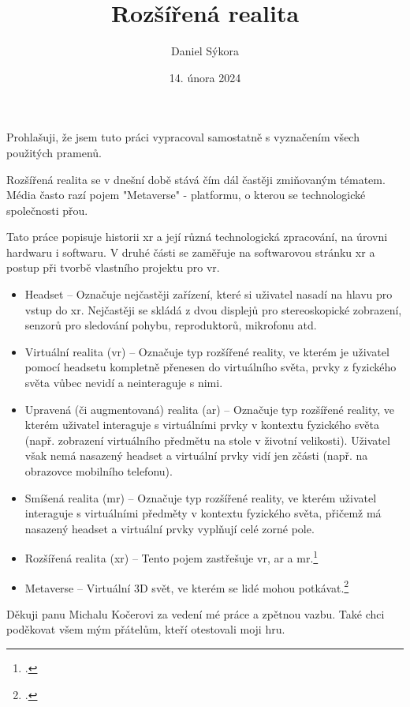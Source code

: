 \documentclass[12pt]{report}
\author{Daniel Sýkora}
\title{Rozšířená realita}
\date{14. února 2024}
\begin{document}
\mytitlepage
\prohlaseni
{
	Prohlašuji, že jsem tuto práci vypracoval samostatně s vyznačením všech použitých pramenů.
}
\abstrakt
{ %
	Rozšířená realita se v dnešní době stává čím dál častěji zmiňovaným tématem. Média často razí pojem "Metaverse" - platformu, o kterou se technologické společnosti přou.

	Tato práce popisuje historii \gls{xr} a její různá technologická zpracování, na úrovni hardwaru i softwaru. V druhé části se zaměřuje na softwarovou stránku \gls{xr} a postup při tvorbě vlastního projektu pro \gls{vr}.
}
{ %
	\begin{itemize}
		\item Headset -- Označuje nejčastěji zařízení, které si uživatel nasadí na hlavu pro vstup do \gls{xr}.
				Nejčastěji se skládá z dvou displejů pro stereoskopické zobrazení, senzorů pro sledování pohybu,
				reproduktorů, mikrofonu atd.

		\item Virtuální realita (\gls{vr}) -- Označuje typ rozšířené reality, ve kterém je uživatel pomocí headsetu
				kompletně přenesen do virtuálního světa, prvky z fyzického světa vůbec nevidí a neinteraguje s nimi.

		\item Upravená (či augmentovaná) realita (\gls{ar}) -- Označuje typ rozšířené reality, ve kterém uživatel interaguje
				s virtuálními prvky v kontextu fyzického světa (např. zobrazení virtuálního předmětu na stole v životní velikosti).
				Uživatel však nemá nasazený headset a virtuální prvky vidí jen zčásti (např. na obrazovce mobilního telefonu).

		\item Smíšená realita (\gls{mr}) -- Označuje typ rozšířené reality, ve kterém uživatel interaguje s virtuálními předměty
				v kontextu fyzického světa, přičemž má nasazený headset a virtuální prvky vyplňují celé zorné pole.

		\item Rozšířená realita (\gls{xr}) -- Tento pojem zastřešuje \gls{vr}, \gls{ar} a \gls{mr}.\footcite{xr_disambiguation}
		
		\item Metaverse -- Virtuální 3D svět, ve kterém se lidé mohou potkávat.\footcite{metaverse_dictionary}
	\end{itemize}
}
\podekovani
{
	Děkuji panu Michalu Kočerovi za vedení mé práce a zpětnou vazbu. Také chci poděkovat všem mým přátelům, kteří otestovali moji hru.
}

\tableofcontents
\newpage






\nocite{*}

\appendix
{}

\printbibliography
{}

\printglossary[title={Zkratky}]

\listoffigures
{}
\end{document}
